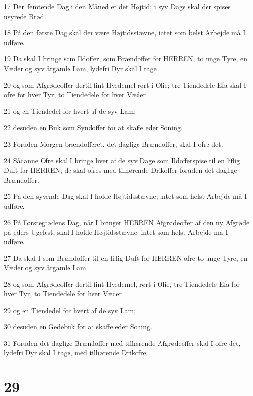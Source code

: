 \par 17 Den femtende Dag i den Måned er det Højtid; i syv Dage skal der spises usyrede Brød.
\par 18 På den første Dag skal der være Højtidsstævne, intet som belst Arbejde må I udføre.
\par 19 Da skal I bringe som Ildoffer, som Brændoffer for HERREN, to unge Tyre, en Væder og syv årgamle Lam, lydefri Dyr skal I tage
\par 20 og som Afgrødeoffer dertil fint Hvedemel rørt i Olie; tre Tiendedele Efa skal I ofre for hver Tyr, to Tiendedele for hver Væder
\par 21 og en Tiendedel for hvert af de syv Lam;
\par 22 desuden en Buk som Syndoffer for at skaffe eder Soning.
\par 23 Foruden Morgen brændofferet, det daglige Brændoffer, skal I ofre det.
\par 24 Sådanne Ofre skal I bringe hver af de syv Dage som Ildofferspise til en liflig Duft for HERREN; de skal ofres med tilhørende Drikoffer foruden det daglige Brændoffer.
\par 25 På den syvende Dag skal I holde Højtidsstævne; intet som helst Arbejde må I udføre.
\par 26 På Førstegrødens Dag, når I bringer HERREN Afgrødeoffer af den ny Afgrøde på eders Ugefest, skal I holde Højtidsstævne; intet som helst Arbejde må I udføre.
\par 27 Da skal I som Brændoffer til en liflig Duft for HERREN ofre to unge Tyre, en Væder og syv årgamle Lam
\par 28 og som Afgrødeoffer dertil fint Hvedemel, rørt i Olie, tre Tiendedele Efa for hver Tyr, to Tiendedele for hver Væder
\par 29 og en Tiendedel for hvert af de syv Lam;
\par 30 desuden en Gedebuk for at skaffe eder Soning.
\par 31 Foruden det daglige Brændoffer med tilhørende Afgrødeoffer skal I ofre det, lydefri Dyr skal I tage, med tilhørende Drikofre.

\chapter{29}

